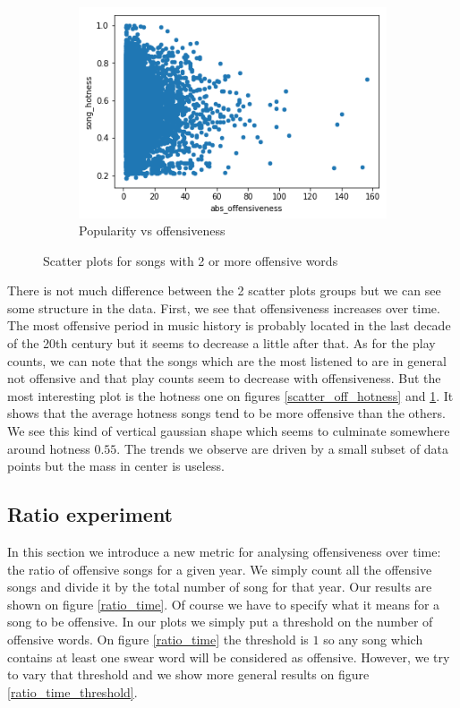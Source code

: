 \documentclass[11pt]{article}
\begin{document}
\begin{figure}
\begin{subfigure}[b]{0.45\textwidth}
\includegraphics[width=\textwidth]{plots/scatter_off_hotness_2}
\caption{Popularity vs offensiveness}
\label{scatter_off_hotness_2}
\end{subfigure}
\caption{Scatter plots for songs with 2 or more offensive words}
\label{scatter_plots_2}
\end{figure}

There is not much difference between the 2 scatter plots groups but we can see some structure in the data. First, we see that offensiveness increases over time. The most offensive period in music history is probably located in the last decade of the 20th century but it seems to decrease a little after that. As for the play counts, we can note that the songs which are the most listened to are in general not offensive and that play counts seem to decrease with offensiveness. But the most interesting plot is the hotness one on figures \ref{scatter_off_hotness} and \ref{scatter_off_hotness_2}. It shows that the average hotness songs tend to be more offensive than the others. We see this kind of vertical gaussian shape which seems to culminate somewhere around hotness $0.55$. The trends we observe are driven by a small subset of data points but the mass in center is useless. 


\subsection{Ratio experiment}
In this section we introduce a new metric for analysing offensiveness over time: the ratio of offensive songs for a given year. We simply count all the offensive songs and divide it by the total number of song for that year. Our results are shown on figure \ref{ratio_time}. Of course we have to specify what it means for a song to be offensive. In our plots we simply put a threshold on the number of offensive words. On figure \ref{ratio_time} the threshold is $1$ so any song which contains at least one swear word will be considered as offensive. However, we try to vary that threshold and we show more general results on figure \ref{ratio_time_threshold}.
\end{document}
